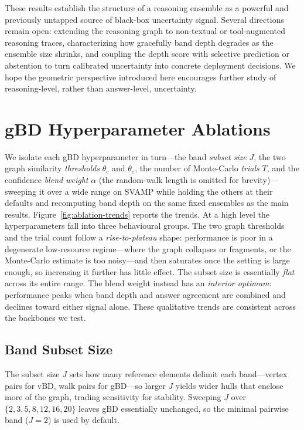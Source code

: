 \documentclass[letterpaper]{article} %
\begin{document}
These results establish the structure of a reasoning ensemble as a powerful and
previously untapped source of black-box uncertainty signal. Several directions
remain open: extending the reasoning graph to non-textual or tool-augmented
reasoning traces, characterizing how gracefully band depth degrades as the
ensemble size shrinks, and coupling the depth score with selective prediction or
abstention to turn calibrated uncertainty into concrete deployment decisions. We
hope the geometric perspective introduced here encourages further study of
reasoning-level, rather than answer-level, uncertainty.

\appendix

\section{gBD Hyperparameter Ablations}
\label{app:ablation}

We isolate each gBD hyperparameter in turn---the band \emph{subset size} $J$, the
two graph similarity \emph{thresholds} $\theta_c$ and $\theta_e$, the number of
Monte-Carlo \emph{trials} $T$, and the confidence \emph{blend weight} $\alpha$ (the
random-walk length is omitted for brevity)---sweeping it over a wide range on SVAMP
while holding the others at their defaults and recomputing band depth on the same
fixed ensembles as the main results. Figure~\ref{fig:ablation-trends} reports the
trends. At a high level the hyperparameters fall into three behavioural groups. The
two graph thresholds and the trial count follow a \emph{rise-to-plateau} shape:
performance is poor in a degenerate low-resource regime---where the graph collapses
or fragments, or the Monte-Carlo estimate is too noisy---and then saturates once the
setting is large enough, so increasing it further has little effect. The subset size
is essentially \emph{flat} across its entire range. The blend weight instead has an
\emph{interior optimum}: performance peaks when band depth and answer agreement are
combined and declines toward either signal alone. These qualitative trends are
consistent across the backbones we test.

\subsection{Band Subset Size}
\label{sec:exp:ablation:subset}

The subset size $J$ sets how many reference elements delimit each band---vertex
pairs for vBD, walk pairs for gBD---so larger $J$ yields wider hulls that enclose
more of the graph, trading sensitivity for stability. Sweeping $J$ over
$\{2,3,5,8,12,16,20\}$ leaves gBD essentially unchanged, so the minimal pairwise
band ($J{=}2$) is used by default.
\end{document}
